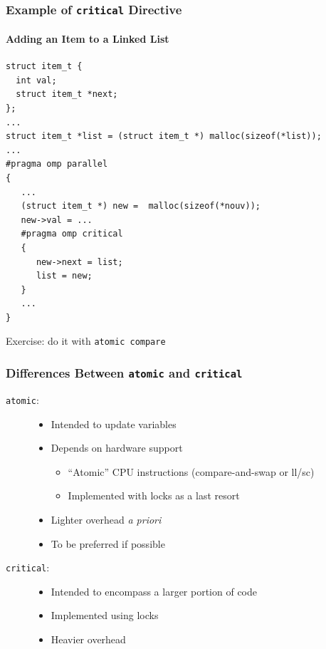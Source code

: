 \documentclass{beamer}
\begin{document}
\begin{frame}[fragile=singleslide]
  \frametitle{Example of \texttt{critical} Directive }
  \framesubtitle{Adding an Item to a Linked List}

\begin{verbatim}
struct item_t {
  int val;
  struct item_t *next;
};
...
struct item_t *list = (struct item_t *) malloc(sizeof(*list)); 
...
#pragma omp parallel 
{ 
   ...
   (struct item_t *) new =  malloc(sizeof(*nouv));
   new->val = ...
   #pragma omp critical 
   {
      new->next = list;
      list = new;
   }
   ...
}
\end{verbatim}

Exercise: do it with \texttt{atomic compare}
  
\end{frame}


\begin{frame}[fragile=singleslide]
  \frametitle{Differences Between \texttt{atomic} and \texttt{critical}}

\begin{description}

\item[\texttt{atomic}:]
  \begin{itemize}
    \item Intended to update variables
    \item Depends on hardware support
      \begin{itemize}
      \item ``Atomic'' CPU instructions (compare-and-swap or ll/sc)
    \item Implemented with locks as a last resort
    \end{itemize}
  \item Lighter overhead \textit{a priori}
  \item \alert{To be preferred if possible}
  \end{itemize}

\bigskip

\item[\texttt{critical}:]
  \begin{itemize}
    \item Intended to encompass a larger portion of code
    \item Implemented using locks
    \item Heavier overhead
  \end{itemize}

\end{description}
\end{frame}
\end{document}

